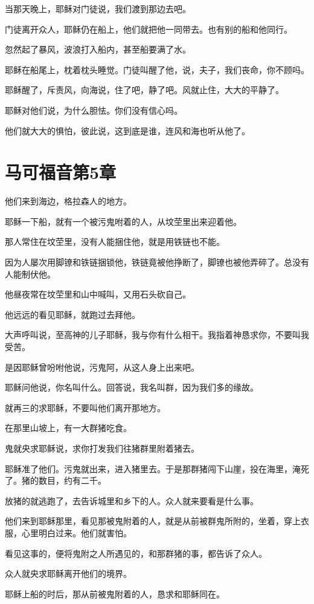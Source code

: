 \documentclass[12pt,oneside]{book}
\begin{document}
当那天晚上，耶稣对门徒说，我们渡到那边去吧。

门徒离开众人，耶稣仍在船上，他们就把他一同带去。也有别的船和他同行。

忽然起了暴风，波浪打入船内，甚至船要满了水。

耶稣在船尾上，枕着枕头睡觉。门徒叫醒了他，说，夫子，我们丧命，你不顾吗。

耶稣醒了，斥责风，向海说，住了吧，静了吧。风就止住，大大的平静了。

耶稣对他们说，为什么胆怯。你们没有信心吗。

他们就大大的惧怕，彼此说，这到底是谁，连风和海也听从他了。

\chapter{马可福音第5章}
他们来到海边，格拉森人的地方。

耶稣一下船，就有一个被污鬼咐着的人，从坟茔里出来迎着他。

那人常住在坟茔里，没有人能捆住他，就是用铁链也不能。

因为人屡次用脚镣和铁链捆锁他，铁链竟被他挣断了，脚镣也被他弄碎了。总没有人能制伏他。

他昼夜常在坟茔里和山中喊叫，又用石头砍自己。

他远远的看见耶稣，就跑过去拜他。

大声呼叫说，至高神的儿子耶稣，我与你有什么相干。我指着神恳求你，不要叫我受苦。

是因耶稣曾吩咐他说，污鬼阿，从这人身上出来吧。

耶稣问他说，你名叫什么。回答说，我名叫群，因为我们多的缘故。

就再三的求耶稣，不要叫他们离开那地方。

在那里山坡上，有一大群猪吃食。

鬼就央求耶稣说，求你打发我们往猪群里附着猪去。

耶稣准了他们。污鬼就出来，进入猪里去。于是那群猪闯下山崖，投在海里，淹死了。猪的数目，约有二千。

放猪的就逃跑了，去告诉城里和乡下的人。众人就来要看是什么事。

他们来到耶稣那里，看见那被鬼附着的人，就是从前被群鬼所附的，坐着，穿上衣服，心里明白过来。他们就害怕。

看见这事的，便将鬼附之人所遇见的，和那群猪的事，都告诉了众人。

众人就央求耶稣离开他们的境界。

耶稣上船的时后，那从前被鬼附着的人，恳求和耶稣同在。
\end{document}
